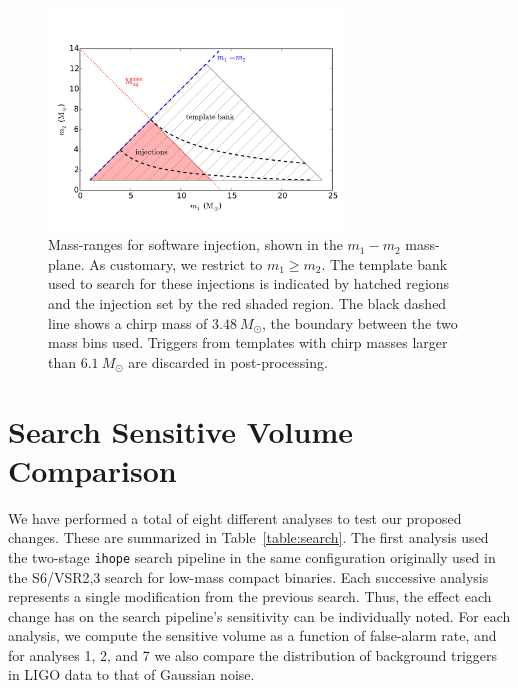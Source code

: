 \documentclass[12pt]{iopart} \usepackage{graphicx,amssymb}
\begin{document}
\begin{figure}[tbh]
\begin{center}
	\includegraphics[width=0.7\textwidth]{figures/lowmass-inj.pdf} 
\caption{Mass-ranges for software injection, shown in the $m_1-m_2$
mass-plane.  As customary, we restrict to $m_1\ge m_2$. The template bank
used to search for these injections is indicated by hatched regions and the
injection set by the red shaded region. The black dashed line shows a chirp
mass of $3.48\ M_\odot$, the boundary between the two mass bins used. Triggers
from templates with chirp masses larger than $6.1\ M_\odot$ are discarded in
post-processing.
}
\label{Inj-massrange}
\end{center}
\end{figure}

\section{Search Sensitive Volume Comparison}
\label{s:results}

We have performed a total of eight different analyses to test our proposed
changes. These are summarized in Table~\ref{table:search}.  The first analysis
used the two-stage \texttt{ihope} search pipeline in the same configuration
originally used in the S6/VSR2,3 search for low-mass compact binaries. Each
successive analysis represents a single modification from the previous search.
Thus, the effect each change has on the search pipeline's sensitivity can be
individually noted. For each analysis, we compute the sensitive volume as a
function of false-alarm rate, and for analyses 1, 2, and 7 we also compare the
distribution of background triggers in LIGO data to that of Gaussian noise.
\end{document}
